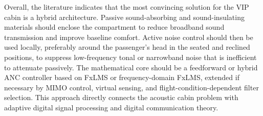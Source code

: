 Overall, the literature indicates that the most convincing solution for the VIP cabin is a hybrid architecture. Passive sound-absorbing and sound-insulating materials should enclose the compartment to reduce broadband sound transmission and improve baseline comfort. Active noise control should then be used locally, preferably around the passenger's head in the seated and reclined positions, to suppress low-frequency tonal or narrowband noise that is inefficient to attenuate passively. The mathematical core should be a feedforward or hybrid ANC controller based on FxLMS or frequency-domain FxLMS, extended if necessary by MIMO control, virtual sensing, and flight-condition-dependent filter selection. This approach directly connects the acoustic cabin problem with adaptive digital signal processing and digital communication theory.

